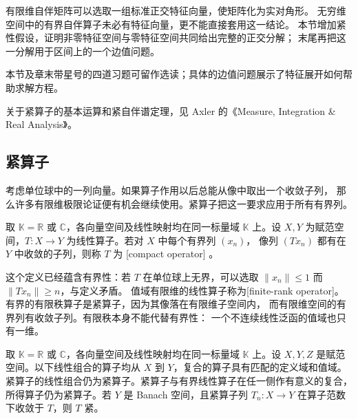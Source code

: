 
有限维自伴矩阵可以选取一组标准正交特征向量，使矩阵化为实对角形。
无穷维空间中的有界自伴算子未必有特征向量，更不能直接套用这一结论。
本节增加紧性假设，证明非零特征空间与零特征空间共同给出完整的正交分解；
末尾再把这一分解用于区间上的一个边值问题。


\ProseParagraphBreak

本节及章末带星号的四道习题可留作选读；具体的边值问题展示了特征展开如何帮助求解方程。

\ProseParagraphBreak

关于紧算子的基本运算和紧自伴谱定理，见 Axler 的《Measure, Integration \& Real Analysis》\cite[Sections 10C and 10D]{Axler2020Measure}。

\subsection{紧算子}
\label{b1:subsec:080501}

考虑单位球中的一列向量。如果算子作用以后总能从像中取出一个收敛子列，
那么许多有限维极限论证便有机会继续使用。紧算子把这一要求应用于所有有界列。

\begin{definition}[紧算子]
\label{b1:def:compact-operator}
取 \(\mathbb K=\mathbb R\) 或 \(\mathbb C\)，各向量空间及线性映射均在同一标量域 \(\mathbb K\) 上。设 \(X,Y\) 为赋范空间，\(T:X\to Y\) 为线性算子。若对 \(X\) 中每个有界列 \((x_n)\)，
像列 \((Tx_n)\) 都有在 \(Y\) 中收敛的子列，则称 \(T\) 为%
[compact operator]%
\nobreak\mbox{。\footnotemark}
\end{definition}

这个定义已经蕴含有界性：若 \(T\) 在单位球上无界，可以选取%
\(\|x_n\|\leq1\) 而 \(\|Tx_n\|\geq n\)，与定义矛盾。
值域有限维的线性算子称为[finite-rank operator]。
有界的有限秩算子是紧算子，因为其像落在有限维子空间内，
而有限维空间的有界列有收敛子列。有限秩本身不能代替有界性：
一个不连续线性泛函的值域也只有一维。

\begin{proposition}[紧算子的运算]
\label{b1:prop:compact-operator-calculus}
取 \(\mathbb K=\mathbb R\) 或 \(\mathbb C\)，各向量空间及线性映射均在同一标量域 \(\mathbb K\) 上。设 \(X,Y,Z\) 是赋范空间。以下线性组合的算子均从 \(X\) 到 \(Y\)，复合的算子具有匹配的定义域和值域。紧算子的线性组合仍为紧算子。紧算子与有界线性算子在任一侧作有意义的复合，
所得算子仍为紧算子。若 \(Y\) 是 Banach 空间，且紧算子列%
\(T_n:X\to Y\) 在算子范数下收敛于 \(T\)，则 \(T\) 紧。
\end{proposition}

